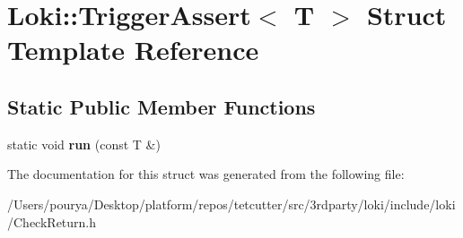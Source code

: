 \hypertarget{structLoki_1_1TriggerAssert}{}\section{Loki\+:\+:Trigger\+Assert$<$ T $>$ Struct Template Reference}
\label{structLoki_1_1TriggerAssert}
\subsection*{Static Public Member Functions}
\begin{DoxyCompactItemize}
\item 
\hypertarget{structLoki_1_1TriggerAssert_a59bb91ad2398ddfecb6f5e4ed708935c}{}static void {\bfseries run} (const T \&)\label{structLoki_1_1TriggerAssert_a59bb91ad2398ddfecb6f5e4ed708935c}

\end{DoxyCompactItemize}


The documentation for this struct was generated from the following file\+:\begin{DoxyCompactItemize}
\item 
/\+Users/pourya/\+Desktop/platform/repos/tetcutter/src/3rdparty/loki/include/loki/Check\+Return.\+h\end{DoxyCompactItemize}
